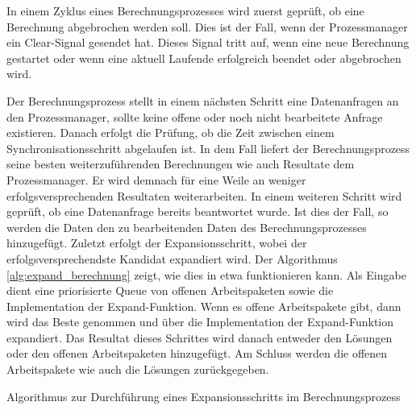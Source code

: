 In einem Zyklus eines Berechnungsprozesses wird zuerst geprüft, ob eine Berechnung abgebrochen werden soll. Dies ist der
Fall, wenn der Prozessmanager ein \glqq Clear-Signal\grqq{} gesendet hat. Dieses Signal tritt auf, wenn eine neue
Berechnung gestartet oder wenn eine aktuell Laufende erfolgreich beendet oder abgebrochen wird.

Der Berechnungsprozess stellt in einem nächsten Schritt eine Datenanfragen an den Prozessmanager, sollte keine offene oder
noch nicht bearbeitete Anfrage existieren. Danach erfolgt die Prüfung, ob die Zeit zwischen einem Synchronisationsschritt
abgelaufen ist. In dem Fall liefert der Berechnungsprozess seine besten weiterzuführenden Berechnungen wie auch Resultate
dem Prozessmanager. Er wird demnach für eine Weile an weniger erfolgsversprechenden Resultaten weiterarbeiten. In einem
weiteren Schritt wird geprüft, ob eine Datenanfrage bereits beantwortet wurde. Ist dies der Fall, so werden die
Daten den zu bearbeitenden Daten des Berechnungsprozesses hinzugefügt. Zuletzt erfolgt der Expansionsschritt, wobei der
erfolgsversprechendste Kandidat expandiert wird.
Der Algorithmus \ref{alg:expand_berechnung} zeigt, wie dies in etwa funktionieren kann.
Als Eingabe dient eine priorisierte Queue von offenen Arbeitspaketen sowie die Implementation der \glqq Expand-Funktion\grqq.
Wenn es offene Arbeitspakete gibt, dann wird das Beste genommen und über die Implementation der
\glqq Expand-Funktion\grqq{} expandiert. Das Resultat dieses Schrittes wird danach entweder den Lösungen oder den
offenen Arbeitspaketen hinzugefügt. Am Schluss werden die offenen Arbeitspakete wie auch die Lösungen zurückgegeben.

\begin{algorithm}[H]
    \DontPrintSemicolon
    \caption{Algorithmus zur Durchführung eines Expansionsschritts im Berechnungsprozess}
    \label{alg:expand_berechnung}
\end{algorithm}

